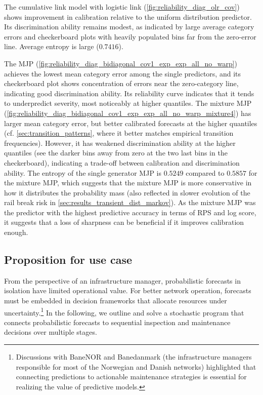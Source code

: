 The cumulative link model with logistic link (\cref{fig:reliability_diag_olr_cov}) shows improvement in calibration relative to the uniform distribution predictor.
Its discrimination ability remains modest, as indicated by large average category errors and checkerboard plots with heavily populated bins far from the zero-error line. Average entropy is large ($0.7416$).

The MJP (\cref{fig:reliability_diag_bidiagonal_cov1_exp_exp_all_no_warp}) achieves the lowest mean category error among the single predictors, and its checkerboard plot shows concentration of errors near the zero-category line, indicating good discrimination ability.
Its reliability curve indicates that it tends to underpredict severity, most noticeably at higher quantiles.
The mixture MJP (\cref{fig:reliability_diag_bidiagonal_cov1_exp_exp_all_no_warp_mixture4}) has larger mean category error, but better calibrated forecasts at the higher quantiles (cf. \cref{sec:transition_patterns}, where it better matches empirical transition frequencies). However, it has weakened discrimination ability at the higher quantiles (see the darker bins away from zero at the two last bins in the checkerboard), indicating a trade-off between calibration and discrimination ability.
The entropy of the single generator MJP is $0.5249$ compared to $0.5857$ for the mixture MJP, which suggests that the mixture MJP is more conservative in how it distributes the probability mass (also reflected in slower evolution of the rail break risk in \cref{sec:results_transient_dist_markov}). As the mixture MJP was the predictor with the highest predictive accuracy in terms of RPS and log score, it suggests that a loss of sharpness can be beneficial if it improves calibration enough.



\subsection{Proposition for use case} \label{sec:proposition_for_use}
From the perspective of an infrastructure manager, probabilistic forecasts in isolation have limited operational value. 
For better network operation, forecasts must be embedded in decision frameworks that allocate resources under uncertainty.\footnote{Discussions with BaneNOR and Banedanmark (the infrastructure managers responsible for most of the Norwegian and Danish networks) highlighted that connecting predictions to actionable maintenance strategies is essential for realizing the value of predictive models.}
In the following, we outline and solve a stochastic program that connects probabilistic forecasts to sequential inspection and maintenance decisions over multiple stages.


